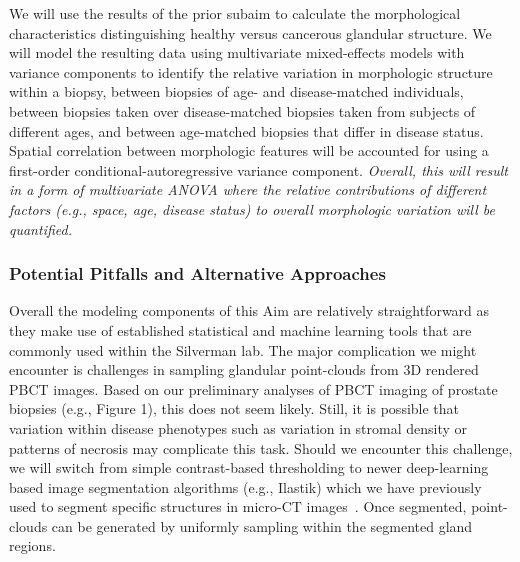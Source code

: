 \documentclass{NIHGrant}
\theoremstyle{theorem}
\begin{document}
We will use the results of the prior subaim to calculate the morphological characteristics distinguishing healthy versus cancerous glandular structure. We will model the resulting data using multivariate mixed-effects models with variance components to identify the relative variation in morphologic structure within a biopsy, between biopsies of age- and disease-matched individuals, between biopsies taken over disease-matched biopsies taken from subjects of different ages, and between age-matched biopsies that differ in disease status. Spatial correlation between morphologic features will be accounted for using a first-order conditional-autoregressive variance component. \emph{Overall, this will result in a form of multivariate ANOVA where the relative contributions of different factors (e.g., space, age, disease status) to overall morphologic variation will be quantified.}

\subsubsection*{Potential Pitfalls and Alternative Approaches} \label{aim3-pitfalls}
Overall the modeling components of this Aim are relatively straightforward as they make use of established statistical and machine learning tools that are commonly used within the Silverman lab. The major complication we might encounter is challenges in sampling glandular point-clouds from 3D rendered PBCT images. Based on our preliminary analyses of PBCT imaging of prostate biopsies (e.g., Figure 1), this does not seem likely. Still, it is possible that variation within disease phenotypes such as variation in stromal density or patterns of necrosis may complicate this task. Should we encounter this challenge, we will switch from simple contrast-based thresholding to newer deep-learning based image segmentation algorithms (e.g., Ilastik) which we have previously used to segment specific structures in micro-CT images~\cite{yakovlev_quantitative_2023}. Once segmented, point-clouds can be generated by uniformly sampling within the segmented gland regions.
\end{document}
